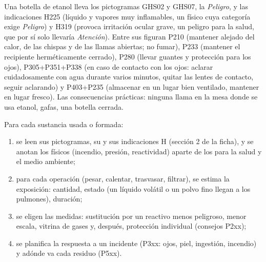 \begin{example}
Una botella de etanol lleva los pictogramas GHS02 y GHS07, la  \emph{Peligro}, y las indicaciones H225 (líquido y vapores
muy inflamables, un  físico cuya categoría exige \emph{Peligro}) y
H319 (provoca irritación ocular grave, un peligro para la salud, que por
sí solo llevaría \emph{Atención}). Entre sus 
figuran P210 (mantener alejado del calor, de las chispas y de las llamas
abiertas; no fumar), P233 (mantener el recipiente herméticamente
cerrado), P280 (llevar guantes y protección para los ojos),
P305+P351+P338 (en caso de contacto con los ojos: aclarar cuidadosamente
con agua durante varios minutos, quitar las lentes de contacto, seguir
aclarando) y P403+P235 (almacenar en un lugar bien ventilado, mantener en
lugar fresco). Las consecuencias prácticas: ninguna llama en la mesa donde
se usa etanol, gafas, una botella cerrada.
\end{example}

\begin{method}\label{met:b1:lab-techniques-1:read-sds}
Para cada sustancia usada o formada:
\begin{enumerate}
  \item se leen sus pictogramas, su  y sus
        indicaciones H (sección 2 de la ficha), y se anotan los 
        físicos (incendio, presión, reactividad) aparte de los 
        para la salud y el medio ambiente;
  \item para cada operación (pesar, calentar, trasvasar, filtrar), se
        estima la exposición: cantidad, estado (un líquido volátil o un
        polvo fino llegan a los pulmones), duración;
  \item se eligen las medidas: sustitución por un reactivo menos
        peligroso, menor escala, vitrina de gases y, después, protección
        individual (consejos P2xx);
  \item se planifica la respuesta a un incidente (P3xx: ojos, piel,
        ingestión, incendio) y adónde va cada residuo (P5xx).
\end{enumerate}
\end{method}

